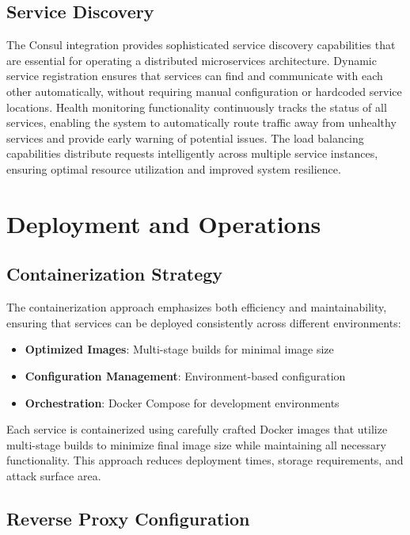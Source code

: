 \documentclass[runningheads]{llncs}
\begin{document}
%
%
%
\subsection{Service Discovery}

The Consul integration provides sophisticated service discovery capabilities that are essential for operating a distributed microservices architecture. Dynamic service registration ensures that services can find and communicate with each other automatically, without requiring manual configuration or hardcoded service locations. Health monitoring functionality continuously tracks the status of all services, enabling the system to automatically route traffic away from unhealthy services and provide early warning of potential issues. The load balancing capabilities distribute requests intelligently across multiple service instances, ensuring optimal resource utilization and improved system resilience.

%
%
%
\section{Deployment and Operations}

%
%
%
\subsection{Containerization Strategy}

The containerization approach emphasizes both efficiency and maintainability, ensuring that services can be deployed consistently across different environments:

\begin{itemize}
    \item \textbf{Optimized Images}: Multi-stage builds for minimal image size
    \item \textbf{Configuration Management}: Environment-based configuration
    \item \textbf{Orchestration}: Docker Compose for development environments
\end{itemize}

Each service is containerized using carefully crafted Docker images that utilize multi-stage builds to minimize final image size while maintaining all necessary functionality. This approach reduces deployment times, storage requirements, and attack surface area.

%
%
%
\subsection{Reverse Proxy Configuration}
\end{document}
